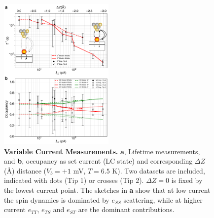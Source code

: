 \documentclass[
reprint,amsmath,amssymb,aps]{revtex4-2}
\begin{document}
\begin{figure}[h!]
\includegraphics[width=0.5\textwidth]{fig5_final_v3.pdf}
\caption{\textbf{Variable Current Measurements.} \textbf{a}, Lifetime measurements, and \textbf{b}, occupancy as set current (LC state) and corresponding $\Delta Z$ (\AA) distance ($V_{b} = +1$ mV, $T = 6.5$ K). Two datasets are included, indicated with dots (Tip 1) or crosses (Tip 2). $\Delta Z = 0$ is fixed by the lowest current point. The sketches in \textbf{a} show that  at low current the spin dynamics is dominated by $e_{SS}$ scattering, while at higher current $e_{TT}$, $e_{TS}$ and $e_{ST}$ are the dominant contributions. 
\label{fig:current} }
\end{figure}
\end{document}
